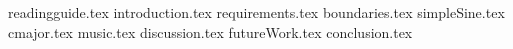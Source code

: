 

{readingguide.tex}
{introduction.tex}
{requirements.tex}
{boundaries.tex}
{simpleSine.tex}
{cmajor.tex}
{music.tex}
{discussion.tex}
{futureWork.tex}
{conclusion.tex}

%
